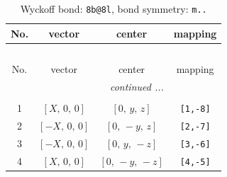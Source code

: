 \documentclass[fleqn,8pt]{jsarticle}
\begin{document}
\renewcommand{\arraystretch}{1.2}
\begin{longtable}{cccc}
\caption{Wyckoff bond: {\tt 8b@8l}, bond symmetry: {\tt m..}}
 \\
 \hline \hline
No. & vector & center & mapping \\ \hline \endfirsthead

\multicolumn{3}{l}{\tablename\ \thetable{}} \\
 \hline \hline
No. & vector & center & mapping \\ \hline \endhead

 \hline \hline
\multicolumn{3}{r}{\footnotesize\it continued ...} \\ \endfoot

 \hline \hline
\multicolumn{3}{r}{} \\ \endlastfoot

1 & $\left[ X,\, 0,\, 0 \right]$ & $\left[ 0,\, y,\, z \right]$ & {\tt [1,-8]} \\ \hline
2 & $\left[ - X,\, 0,\, 0 \right]$ & $\left[ 0,\, - y,\, z \right]$ & {\tt [2,-7]} \\ \hline
3 & $\left[ - X,\, 0,\, 0 \right]$ & $\left[ 0,\, y,\, - z \right]$ & {\tt [3,-6]} \\ \hline
4 & $\left[ X,\, 0,\, 0 \right]$ & $\left[ 0,\, - y,\, - z \right]$ & {\tt [4,-5]} \\
\end{longtable}
\renewcommand{\arraystretch}{1.2}
\end{document}
